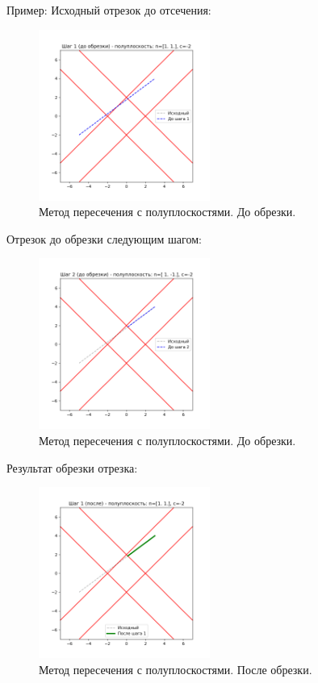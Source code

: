 \documentclass[areasetadvanced]{scrartcl}
\begin{document}
Пример: 
Исходный отрезок до отсечения:
\begin{figure}[H]
    \centering
    \includegraphics[width=0.5\textwidth]{../images/halfplane_step_1_before.png}
    \caption{Метод пересечения с полуплоскостями. До обрезки.}
    \label{fig:halfplane_step1}
\end{figure}
Отрезок до обрезки следующим шагом:
\begin{figure}[H]
    \centering
    \includegraphics[width=0.5\textwidth]{../images/halfplane_step_3_before.png}
    \caption{Метод пересечения с полуплоскостями. До обрезки.}
    \label{fig:halfplane_step3}
\end{figure}
Результат обрезки отрезка:
\begin{figure}[H]
    \centering
    \includegraphics[width=0.5\textwidth]{../images/halfplane_step_2_after.png}
    \caption{Метод пересечения с полуплоскостями. После обрезки.}
    \label{fig:halfplane_step2}
\end{figure}
\newpage
\end{document}
